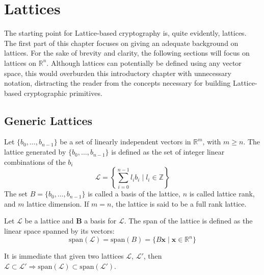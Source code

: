 \section{Lattices}

The starting point for Lattice-based cryptography is, quite evidently, lattices. The first part of this chapter focuses on giving an adequate background on lattices. For the sake of brevity and clarity, the following sections will focus on lattices on $\mathbb{R}^n$. Although lattices can potentially be defined using any vector space, this would overburden this introductory chapter with unnecessary notation, distracting the reader from the concepts necessary for building Lattice-based cryptographic primitives.

\subsection{Generic Lattices}\label{sec:bg:g_lattice}

\begin{definition}[Lattice]
Let $\{b_0,\ldots,b_{n-1}\}$ be a set of linearly independent vectors in $\mathbb{R}^m$, with $m\geq n$. The lattice generated by $\{b_0,\ldots,b_{n-1}\}$ is defined as the set of integer linear combinations of the $b_i$
\begin{equation*}
\mathscr{L}=\left\{\sum_{i=0}^{n-1}l_ib_i \mid l_i\in\mathbb{Z}\right\}
\end{equation*}
The set $B=\{b_0,\ldots,b_{n-1}\}$ is called a basis of the lattice, $n$ is called lattice rank, and $m$ lattice dimension. If $m=n$, the lattice is said to be a full rank lattice.
\end{definition}

\begin{definition}
Let $\mathscr{L}$ be a lattice and $\mathbf{B}$ a basis for $\mathscr{L}$. The span of the lattice is defined as the linear space spanned by its vectors:
\begin{equation*}
\mathrm{span}(\mathscr{L}) = \mathrm{span}(B) = \{B\mathbf{x}\mid\mathbf{x}\in\mathbb{R}^n\}
\end{equation*} 
\end{definition}

\begin{remark}
It is immediate that given two lattices $\mathscr{L}$, $\mathscr{L}'$, then $\mathscr{L}\subset \mathscr{L}' \Rightarrow \mathrm{span}(\mathscr{L}) \subset \mathrm{span}(\mathscr{L}')$.
\end{remark}

